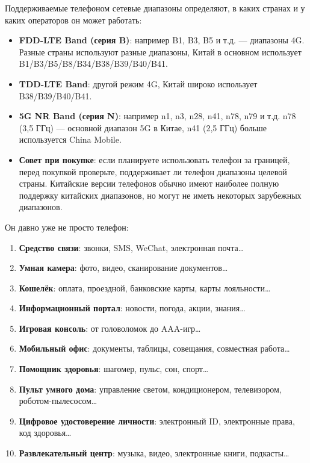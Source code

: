 Поддерживаемые телефоном сетевые диапазоны определяют, в каких странах и у каких операторов он может работать:

\begin{itemize}
  \item \textbf{FDD-LTE Band (серия B)}: например B1, B3, B5 и т.д. — диапазоны 4G. Разные страны используют разные диапазоны, Китай в основном использует B1/B3/B5/B8/B34/B38/B39/B40/B41.
  \item \textbf{TDD-LTE Band}: другой режим 4G, Китай широко использует B38/B39/B40/B41.
  \item \textbf{5G NR Band (серия N)}: например n1, n3, n28, n41, n78, n79 и т.д. n78 (3,5 ГГц) — основной диапазон 5G в Китае, n41 (2,5 ГГц) больше используется China Mobile.
  \item \textbf{Совет при покупке}: если планируете использовать телефон за границей, перед покупкой проверьте, поддерживает ли телефон диапазоны целевой страны. Китайские версии телефонов обычно имеют наиболее полную поддержку китайских диапазонов, но могут не иметь некоторых зарубежных диапазонов.
\end{itemize}


Он давно уже не просто телефон:

\begin{enumerate}
  \item \textbf{Средство связи}: звонки, SMS, WeChat, электронная почта…
  \item \textbf{Умная камера}: фото, видео, сканирование документов…
  \item \textbf{Кошелёк}: оплата, проездной, банковские карты, карты лояльности…
  \item \textbf{Информационный портал}: новости, погода, акции, знания…
  \item \textbf{Игровая консоль}: от головоломок до AAA-игр…
  \item \textbf{Мобильный офис}: документы, таблицы, совещания, совместная работа…
  \item \textbf{Помощник здоровья}: шагомер, пульс, сон, спорт…
  \item \textbf{Пульт умного дома}: управление светом, кондиционером, телевизором, роботом-пылесосом…
  \item \textbf{Цифровое удостоверение личности}: электронный ID, электронные права, код здоровья…
  \item \textbf{Развлекательный центр}: музыка, видео, электронные книги, подкасты…
\end{enumerate}

